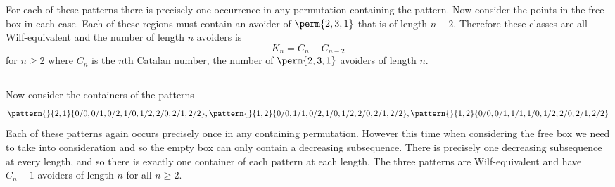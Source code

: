 For each of these patterns there is precisely one occurrence
in any permutation containing the pattern. Now consider
the points in the free box in each case. Each of these regions
must contain an avoider of \(\perm{2,3,1}\) that is of length
\(n-2\). Therefore these classes are all Wilf-equivalent
and the number of length \(n\) avoiders is
\begin{equation*}
    K_n = C_n - C_{n-2}
\end{equation*}
for \(n \ge 2\) where \(C_n\) is the \(n\)th Catalan number, the number of
\(\perm{2,3,1}\) avoiders of length \(n\).

\subsection{}
Now consider the containers of the patterns
\begin{equation*}
    \pattern{}{2,1}{0/0,0/1,0/2,1/0,1/2,2/0,2/1,2/2},
    \pattern{}{1,2}{0/0,1/1,0/2,1/0,1/2,2/0,2/1,2/2},
    \pattern{}{1,2}{0/0,0/1,1/1,1/0,1/2,2/0,2/1,2/2}
\end{equation*}
Each of these patterns again occurs precisely once in
any containing permutation. However this time when considering
the free box we need to take into consideration 
and so the empty box can only contain a decreasing subsequence. There
is precisely one decreasing subsequence at every length, and so there
is exactly one container of each pattern at each length. The three
patterns are Wilf-equivalent and have \(C_n - 1\) avoiders of
length \(n\) for all \(n \ge 2\).

